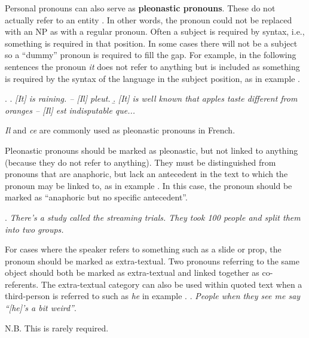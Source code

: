 \documentclass[a4paper]{article}
\begin{document}
Personal pronouns can also serve as {\bf pleonastic pronouns}. These do not
actually refer to an entity \cite[p. 5]{GuillouEtAlGuide}. In other words, the
pronoun could not be replaced with an NP as with a regular pronoun. Often a
subject is required by syntax, i.e., something is required in that position. In
some cases there will not be a subject so a ``dummy'' pronoun is required to
fill the gap. For example, in the following sentences the pronoun {\sl it} does
not refer to anything but is included as something is required by the syntax of
the language in the subject position, as in example \Next.

\ex.
\a. {\sl [It] is raining. -- [Il] pleut.}
\b. {\sl [It] is well known that apples taste different from oranges --  [Il]
est indisputable que...}

\textsl{Il} and \textsl{ce} are commonly used as pleonastic pronouns in French.



Pleonastic pronouns should be marked as pleonastic, but not linked to anything
(because they do not refer to anything). They must be distinguished from
pronouns that are anaphoric, but lack an antecedent in the text to which the
pronoun may be linked to, as in example \Next. In this case, the pronoun should
be marked as ``anaphoric but no specific antecedent''.

\ex. {\sl There's a study called the streaming trials. {\sl They} took 100 people and split them into two groups.}

For cases where the speaker refers to something such as a slide or prop, the pronoun should be marked as extra-textual. Two pronouns referring to the same object should both be marked as extra-textual and linked together as co-referents.
The extra-textual category can also be used within quoted text when a third-person is referred to such as {\sl he} in example \Next.
\ex.
{\sl People when they see me say ``[he]'s a bit weird''}.

N.B. This is rarely required.
\end{document}
